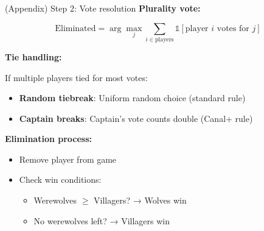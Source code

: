 \documentclass[10pt]{beamer}
\begin{document}
\begin{frame}{(Appendix) Step 2: Vote resolution}
  \textbf{Plurality vote:}
  
  $$\text{Eliminated} = \arg\max_j \sum_{i \in \text{players}} \mathbb{1}[\text{player } i \text{ votes for } j]$$

  \vspace{0.3cm}
  \textbf{Tie handling:}
  
  If multiple players tied for most votes:
  \begin{itemize}
    \item \textbf{Random tiebreak}: Uniform random choice (standard rule)
    \item \textbf{Captain breaks}: Captain's vote counts double (Canal+ rule)
  \end{itemize}

  \vspace{0.3cm}
  \textbf{Elimination process:}
  \begin{itemize}
    \item Remove player from game
    \item Check win conditions:
    \begin{itemize}
      \item Werewolves $\geq$ Villagers? → Wolves win
      \item No werewolves left? → Villagers win
    \end{itemize}
  \end{itemize}

\end{frame}
\end{document}
